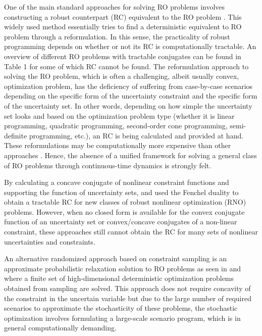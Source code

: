 \documentclass[journal,twoside,web]{ieeecolor}
\begin{document}
One of the main standard approaches for solving RO problems involves constructing a robust counterpart (RC) equivalent to the RO problem \cite{bental2009}. This widely used method essentially tries to find a deterministic equivalent to RO problem through a reformulation. In this sense, the practicality of robust programming depends on whether or not its RC is computationally tractable. An overview of different RO problems with tractable conjugates can be found in \cite{gorissen20152} Table 1 for some of which RC cannot be found. The reformulation approach to solving the RO problem, which is often a challenging, albeit usually convex, optimization problem, has the deficiency of suffering from case-by-case scenarios depending on the specific form of the uncertainty constraint and the specific form of the uncertainty set. In other words, depending on how simple the uncertainty set looks and based on the optimization problem type (whether it is linear programming, quadratic programming, second-order cone programming, semi-definite programming, etc.), an RC is being calculated and provided at hand. These reformulations may be computationally more expensive than other approaches \cite{bertsimas2016}. Hence, the absence of a unified framework for solving a general class of RO problems through continuous-time dynamics is strongly felt.

By calculating a concave conjugate of nonlinear constraint functions and supporting the function of uncertainty sets, \cite{bental20152} and \cite{gorissen20152} used the Fenchel duality to obtain a tractable RC for new classes of robust nonlinear optimization (RNO) problems. However, when no closed form is available for the convex conjugate function of an uncertainty set or convex/concave conjugates of a non-linear constraint, these approaches still cannot obtain the RC for many sets of nonlinear uncertainties and constraints.

An alternative randomized approach based on constraint sampling is an approximate probabilistic relaxation solution to RO problems as seen in \cite{calafiore2004} and \cite{calafiore2010} where a finite set of high-dimensional deterministic optimization problems obtained from sampling are solved. This approach does not require concavity of the constraint in the uncertain variable but due to the large number of required scenarios to approximate the stochasticity of these problems, the stochastic optimization involves formulating a large-scale scenario program, which is in general computationally demanding.
\end{document}
